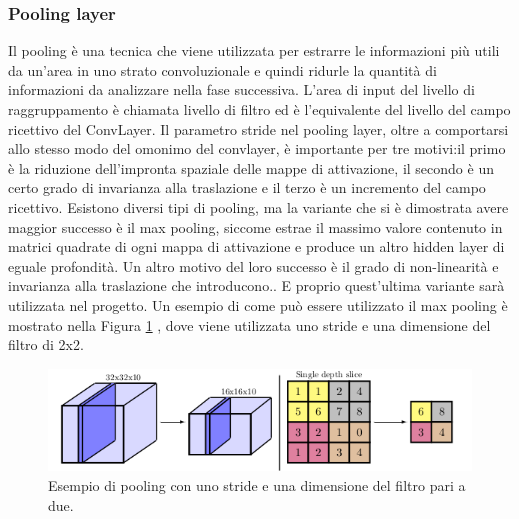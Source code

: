 \documentclass[14pt]{extarticle}
\begin{document}
\subsubsection{Pooling layer}
Il pooling è una tecnica che viene utilizzata per estrarre le informazioni più utili da un'area in uno strato convoluzionale e quindi ridurle
la quantità di informazioni da analizzare nella fase successiva. L'area di input del livello di raggruppamento è chiamata livello di filtro ed è l'equivalente del livello del campo ricettivo del ConvLayer. Il parametro stride nel pooling layer, oltre a comportarsi allo stesso modo del omonimo del convlayer, è importante per tre motivi:il primo è la riduzione
dell’impronta spaziale delle mappe di attivazione, il secondo è un certo grado di invarianza alla traslazione e il terzo è un incremento del campo ricettivo.\cite{aggarwal2018neural}
Esistono diversi tipi di pooling, ma la variante che si è dimostrata avere maggior successo è il max pooling,  siccome estrae il massimo valore contenuto in matrici quadrate di ogni mappa di
attivazione e produce un altro hidden layer di eguale profondità. Un altro motivo del loro successo è il grado di non-linearità e invarianza alla traslazione che
introducono.\cite{aggarwal2018neural}.
E proprio quest'ultima variante sarà utilizzata nel progetto.
 Un esempio di come può essere utilizzato il max pooling
è mostrato nella Figura \ref{fig:pooling} , dove viene utilizzata uno stride e una dimensione del filtro di 2x2.
\begin{figure}
\centering
\includegraphics[scale=0.5]{maxpooling.png}
\caption{Esempio di pooling con uno stride e una dimensione del filtro pari a due.}
\label{fig:pooling}
\end{figure}

\end{document}
